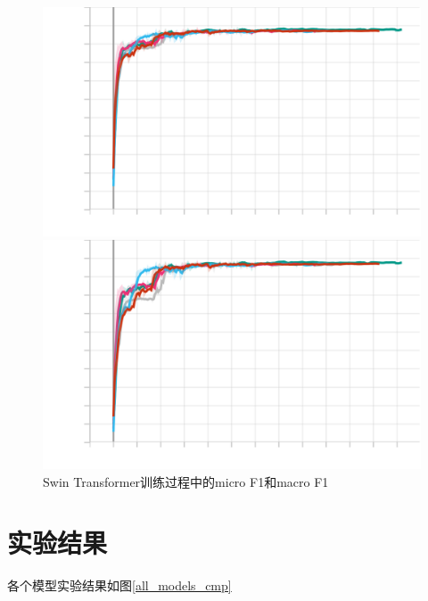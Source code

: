 \documentclass{article}
\begin{document}
\begin{figure}[H]
    \begin{minipage}[H]{0.5\linewidth}
        \centering
        \includegraphics[width=\textwidth]{figures/swintrans_noaug_microf1score_dev.png}
    \end{minipage}
    \begin{minipage}[H]{0.5\linewidth}
        \centering
        \includegraphics[width=\textwidth]{figures/swintrans_noaug_macrof1score_dev.png}
    \end{minipage}
    \caption{Swin Transformer训练过程中的micro F1和macro F1}
    \label{swintrans-f1s}
\end{figure}

\section{实验结果}

各个模型实验结果如图\ref{all_models_cmp}
\end{document}
